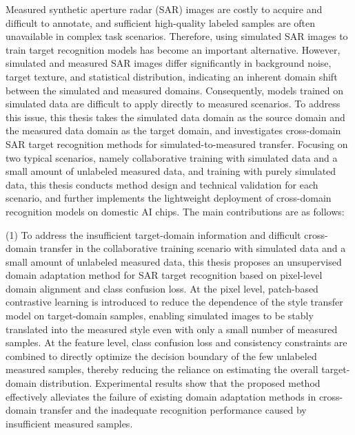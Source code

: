 \begin{eabstract}
Measured synthetic aperture radar (SAR) images are costly to acquire and difficult to annotate, and sufficient high-quality labeled samples are often unavailable in complex task scenarios. Therefore, using simulated SAR images to train target recognition models has become an important alternative. However, simulated and measured SAR images differ significantly in background noise, target texture, and statistical distribution, indicating an inherent domain shift between the simulated and measured domains. Consequently, models trained on simulated data are difficult to apply directly to measured scenarios. To address this issue, this thesis takes the simulated data domain as the source domain and the measured data domain as the target domain, and investigates cross-domain SAR target recognition methods for simulated-to-measured transfer. Focusing on two typical scenarios, namely collaborative training with simulated data and a small amount of unlabeled measured data, and training with purely simulated data, this thesis conducts method design and technical validation for each scenario, and further implements the lightweight deployment of cross-domain recognition models on domestic AI chips. The main contributions are as follows:

(1) To address the insufficient target-domain information and difficult cross-domain transfer in the collaborative training scenario with simulated data and a small amount of unlabeled measured data, this thesis proposes an unsupervised domain adaptation method for SAR target recognition based on pixel-level domain alignment and class confusion loss. At the pixel level, patch-based contrastive learning is introduced to reduce the dependence of the style transfer model on target-domain samples, enabling simulated images to be stably translated into the measured style even with only a small number of measured samples. At the feature level, class confusion loss and consistency constraints are combined to directly optimize the decision boundary of the few unlabeled measured samples, thereby reducing the reliance on estimating the overall target-domain distribution. Experimental results show that the proposed method effectively alleviates the failure of existing domain adaptation methods in cross-domain transfer and the inadequate recognition performance caused by insufficient measured samples.


\end{eabstract}
